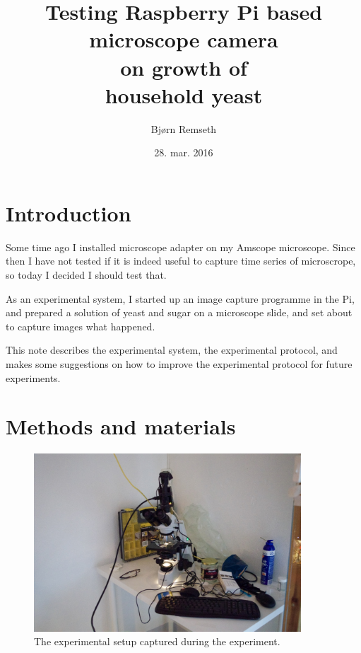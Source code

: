\documentclass[12pt, a4paper]{article}
\begin{document}
\title{Testing Raspberry Pi  based \\ microscope camera \\ on  growth
  of \\  household yeast}
\author{Bjørn Remseth}
\date{28. mar. 2016}
\maketitle
{}

\section{Introduction}

Some time ago I installed microscope adapter on my Amscope
microscope.   Since then I have not tested if it is indeed useful to
capture time series of microscrope, so today I decided I should test
that. 

As an experimental system, I started up an image capture programme in
the Pi, and prepared a solution of yeast and sugar on a microscope
slide, and set about to capture images what happened.

This note describes the experimental system, the experimental
protocol, and makes some suggestions on how to improve the
experimental protocol for future experiments.

\section{Methods and materials}

\begin{figure}[th]
\begin{center}
\includegraphics[width=10cm]{images/experimental_setup.jpg}
\caption{The experimental setup captured during the experiment.}
\label{lastimage}
\end{center}
\end{figure}
\end{document}
